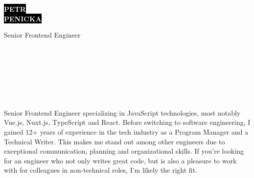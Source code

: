 \documentclass[9pt]{developercv}
\begin{document}
\begin{minipage}[t]{0.41\textwidth}
  \vspace{-\baselineskip}

  \colorbox{black}{{\HUGE\textcolor{white}{\textbf{\MakeUppercase{Petr}}}}}
  \\
  \colorbox{black}{{\HUGE\textcolor{white}{\textbf{\MakeUppercase{Penicka}}}}}

  \vspace{6pt}

  {\huge Senior Frontend Engineer}
\end{minipage}
\begin{minipage}[t]{0.275\textwidth}
  \vspace{-\baselineskip}

  \\
  \\
  \\
\end{minipage}
\begin{minipage}[t]{0.34\textwidth}
  \vspace{-\baselineskip}

  \\
  \\
\end{minipage}

\vspace{0.5cm}


\begin{minipage}[t]{1\textwidth}
  \vspace{-\baselineskip}

  {Senior Frontend Engineer specializing in JavaScript technologies, most notably Vue.js, Nuxt.js, TypeScript and React. Before switching to software engineering, I gained 12+ years of experience in the tech industry as a Program Manager and a Technical Writer. This makes me stand out among other engineers due to exceptional communication, planning and organizational skills. If you're looking for an engineer who not only writes great code, but is also a pleasure to work with for colleagues in non-technical roles, I'm likely the right fit.}\\
\end{minipage}
\end{document}
